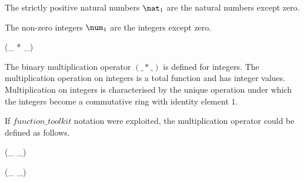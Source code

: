 \documentclass[draft,a4paper,10pt,wd]{isov2}
\begin{document}
The strictly positive natural numbers $\nat_1$
are the natural numbers except zero. 



The non-zero integers $\num_1$ are the integers except zero. 


\begin{zed}
 \leftassoc (\_ * \_)
\end{zed}


The binary multiplication operator $(\_ * \_)$ is defined for integers.
The multiplication operation on integers
is a total function and has integer values.
Multiplication on integers is characterised by the unique operation under
which the integers become a commutative ring with identity element $1$.
\begin{note}
If $function\_toolkit$ notation were exploited,
the multiplication operator could be defined as follows.
\end{note}


\begin{zed}
 \leftassoc (\_ \div \_)
\end{zed}
\begin{zed}
 \leftassoc (\_ \mod \_)
\end{zed}
\end{document}
